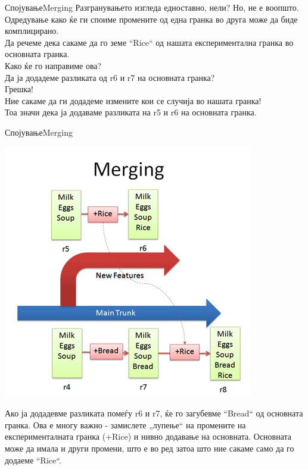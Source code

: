 \begin{frame}{Спојување}{Merging}
Разгранувањето изгледа едноставно, нели? Но, не е воопшто. \\
Одредување како ќе ги споиме промените од една гранка во друга може да биде
комплицирано.\\ 
Да речеме дека сакаме да го земе “Rice“ од нашата експериментална гранка во основната
гранка.\\
Како ќе го направиме ова?\\
Да ја додадеме разликата од r6 и r7 на основната гранка?\\ 
Грешка!\\
Ние сакаме да ги додадеме измените кои се случија во нашата гранка!\\
Тоа значи дека ја додаваме разликата на r5 и r6 на основната гранка.
\end{frame}

\begin{frame}{Спојување}{Merging}
\begin{center}
    \includegraphics[scale=0.30]{images/merging.png}
\end{center}
\begin{scriptsize}
Ако ја додадевме разликата помеѓу r6 и r7, ќе го загубевме “Bread“ од основната
гранка. Ова е многу важно - замислете „лупење“ на промените на експерименталната
гранка (+Rice) и нивно додавање на основната. Основната може да имала и други
промени, што е во ред затоа што ние сакаме само да го додаеме “Rice“.
\end{scriptsize}
\end{frame}

